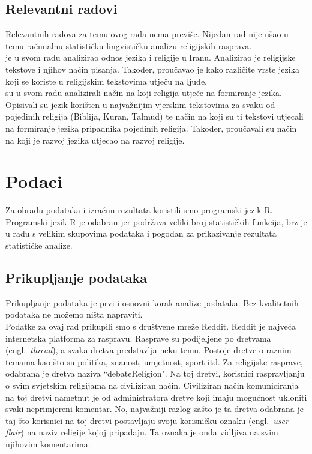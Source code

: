 \documentclass[times,utf8,zavrsni]{fer}
\begin{document}


\newpage
\section{Relevantni radovi}

Relevantnih radova za temu ovog rada nema previše. Nijedan rad nije ušao u temu računalnu statističku lingvističku analizu religijskih rasprava. \\

\citep{rahimi} je u svom radu analizirao odnos jezika i religije u Iranu. Analizirao je religijske tekstove i njihov način pisanja. Također, proučavao je kako različite vrste jezika koji se koriste u religijskim tekstovima utječu na ljude. \\

\citep{darquen} su u svom radu analizirali način na koji religija utječe na formiranje jezika. Opisivali su jezik korišten u najvažnijim vjerskim tekstovima za svaku od pojedinih religija (Biblija, Kuran, Talmud) te način na koji su ti tekstovi utjecali na formiranje jezika pripadnika pojedinih religija. Također, proučavali su način na koji je razvoj jezika utjecao na razvoj religije.



\chapter{Podaci}


Za obradu podataka i izračun rezultata koristili smo programski jezik R. Programski jezik R je odabran jer podržava veliki broj statističkih funkcija, brz je u radu s velikim skupovima podataka i pogodan za prikazivanje rezultata statističke analize.

\section{Prikupljanje podataka}
Prikupljanje podataka je prvi i osnovni korak analize podataka. Bez kvalitetnih podataka ne možemo ništa napraviti. \\

Podatke za ovaj rad prikupili smo s društvene mreže Reddit. Reddit je najveća internetska platforma za raspravu. Rasprave su podijeljene po dretvama (engl.~\emph{thread}), a svaka dretva predstavlja neku temu. Postoje dretve o raznim temama kao što su politika, znanost, umjetnost, sport itd. Za religijske rasprave, odabrana je dretva naziva ``debateReligion". Na toj dretvi, korisnici raspravljanju o svim svjetskim religijama na civiliziran način. Civiliziran način komuniciranja na toj dretvi nametnut je od administratora dretve koji imaju mogućnost ukloniti svaki neprimjereni komentar. No, najvažniji razlog zašto je ta dretva odabrana je taj što korisnici na toj dretvi postavljaju svoju korisničku oznaku (engl.~\emph{user flair}) na naziv religije kojoj pripadaju. Ta oznaka je onda vidljiva na svim njihovim komentarima. \\
\end{document}
